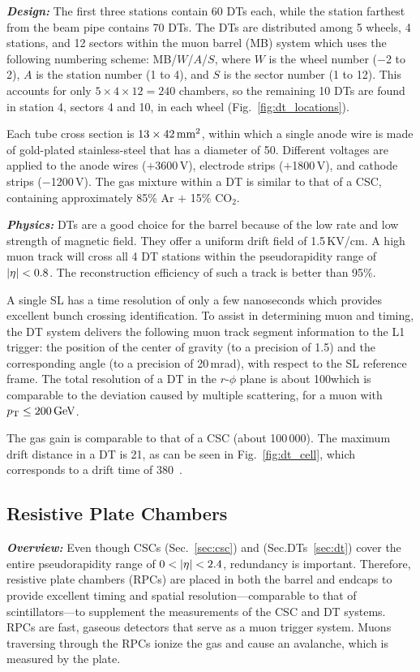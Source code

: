\textbf{\textit{Design:}}
The first three stations contain 60 DTs each, while the station farthest from the beam pipe contains 70 DTs.
The DTs are distributed among 5 wheels, 4 stations, and 12 sectors within the muon barrel (MB) system which uses the following numbering scheme:
MB/$W$/$A$/$S$,
where $W$ is the wheel number ($-$2 to 2),
$A$ is the station number (1 to 4),
and $S$ is the sector number (1 to 12).
This accounts for only $5 \times 4 \times 12 = 240$ chambers, so the remaining 10 DTs are found in station 4, sectors 4 and 10, in each wheel (Fig.~\ref{fig:dt_locations}).

Each tube cross section is $13 \times 42\,\text{mm}^{2}$, within which a single anode wire is made of gold-plated stainless-steel that has a diameter of 50\mum.
Different voltages are applied to the anode wires ($+$3600\,V), electrode strips ($+$1800\,V), and cathode strips ($-$1200\,V).
The gas mixture within a DT is similar to that of a CSC, containing approximately 85\% Ar $+$ 15\% CO$_{2}$.

\textbf{\textit{Physics:}}
DTs are a good choice for the barrel because of the low rate and low strength of magnetic field.
They offer a uniform drift field of 1.5\,KV/cm.
A high \pt muon track will cross all 4 DT stations within the pseudorapidity range of $\lvert \eta \rvert < 0.8$.
The reconstruction efficiency of such a track is better than 95\%.

A single SL has a time resolution of only a few nanoseconds which provides excellent bunch crossing identification.
To assist in determining muon \pt and timing, the DT system delivers the following muon track segment information to the L1 trigger:
the position of the center of gravity (to a precision of 1.5\mm) and the corresponding angle (to a precision of 20\,mrad), with respect to the SL reference frame.
The total resolution of a DT in the $r$-$\phi$ plane is about 100\mum which is comparable to the deviation caused by multiple scattering, for a muon with $p_{\mathrm{T}} \le 200\,\text{Ge\hspace{-.08em}V}$.

The gas gain is comparable to that of a CSC (about 100\,000).
The maximum drift distance in a DT is 21\mm, as can be seen in Fig.~\ref{fig:dt_cell}, which corresponds to a drift time of 380~\ns.

\subsection{Resistive Plate Chambers}
\label{sec:rpc}

\textbf{\textit{Overview:}}
Even though CSCs (Sec.~\ref{sec:csc}) and (Sec.DTs~\ref{sec:dt}) cover the entire pseudorapidity range of $0 < \lvert \eta \rvert < 2.4$, redundancy is important.
Therefore, resistive plate chambers (RPCs) are placed in both the barrel and endcaps to provide excellent timing and spatial resolution---comparable to that of scintillators---to supplement the measurements of the CSC and DT systems.
RPCs are fast, gaseous detectors that serve as a muon trigger system.
Muons traversing through the RPCs ionize the gas and cause an avalanche, which is measured by the plate.

